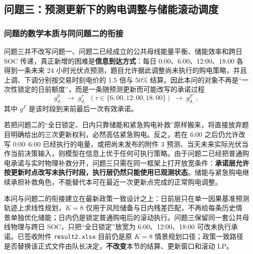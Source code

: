
\newcommand{\QThreeUnsigned}{[待签收]}
\newcommand{\QThreeMainCost}{\QThreeUnsigned}
\newcommand{\QThreeMZeroCost}{\QThreeUnsigned}
\newcommand{\QThreeSaveVsMZero}{\QThreeUnsigned}
\newcommand{\QThreeSavePct}{\QThreeUnsigned}
\newcommand{\QThreeEmergDrop}{\QThreeUnsigned}
\newcommand{\QThreeSettleLift}{\QThreeUnsigned}
\newcommand{\QThreeYearEndA}{1200}
\newcommand{\QThreeYearEndB}{6000}

\subsection{问题三：预测更新下的购电调整与储能滚动调度}

\subsubsection{问题的数学本质与同问题二的衔接}

问题三并不改写问题一、问题二已经成立的公共母线能量平衡、储能效率和跨日 SOC 传递，真正新增的困难是\textbf{信息到达方式}：每日 0:00、6:00、12:00、18:00 各得到一条未来 24 小时光伏点预测，题目允许据此调整尚未执行的购电策略，并且上调、下调分别按交易时刻电价的 1.5 倍与 50\% 结算。因此本问的对象不再是“一次性锁定的日前额度”，而是一条随预测更新而可能改写的承诺过程
\[
g^{0}_{d,\cdot}\;\longrightarrow\;
g^{\tau}_{d,\cdot}\ (\tau\in\{6{:}00,12{:}00,18{:}00\})\;\longrightarrow\;
g^{F}_{d,\cdot},
\]
其中 \(g^{F}\) 是该时段到来前最后一次有效承诺。

若把问题二的“全日锁定、日内只靠储能和紧急购电补救”原样搬来，将直接放弃题目明确给出的三次更新权利，必然高估紧急购电。反之，若在 6:00 之后仍允许改写 0:00--6:00 已经执行的电量，或把尚未发布的附件 3 预测、当天未来实际光伏当作当前决策输入，则模型在信息上优于任何可执行策略。由于问题二已经把普通购电承诺与实时物理补救分开，问题三只需在同一框架上打开放宽条件：\textbf{承诺层允许按更新时点改写未执行时段，执行层仍然只能使用已观测状态}。储能与紧急购电继续承担补救角色，不能替代本可在最近一次更新点完成的正常购电调整。

本问与问题二的衔接建立在最新政策一致设计之上：日前层只在单一因果基准预测轨迹上求线性规划，\(K=8\) 仅用于风险储备与日内残差匹配，不再给每条历史情景单独优化储能；日内仍是锁定普通购电后的滚动执行。问题三保留同一套公共母线物理与跨日 SOC，只把“全日锁定”放宽为 6:00、12:00、18:00 可改未执行承诺。已签收附件 \texttt{result2.xlsx} 目前仍是原 \(K=8\) 情景规划口径；政策一致路径是否替换该正式文件由队长决定，\textbf{不改变}本节的结算、更新窗口和滚动 LP。

